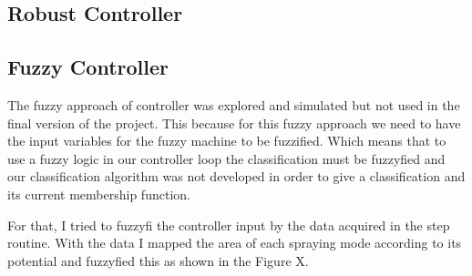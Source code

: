     \subsection{Robust Controller}

    \subsection{Fuzzy Controller}

        The fuzzy approach of controller was explored and simulated but not used in the final version of the project.
        This because for this fuzzy approach we need to have the input variables for the fuzzy machine to be fuzzified.
        Which means that to use a fuzzy logic in our controller loop the classification must be fuzzyfied and our classification algorithm was not developed in order to give a classification and its current membership function.

        For that, I tried to fuzzyfi the controller input by the data acquired in the step routine. With the data I mapped the area of each spraying mode according to its potential and fuzzyfied this as shown in the Figure X.

